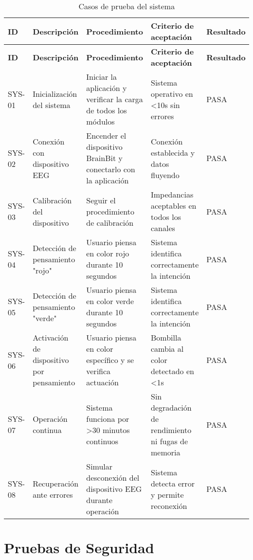 \begin{center}
\small
\begin{longtable}{|p{1cm}|p{3.5cm}|p{3.5cm}|p{3.5cm}|p{1.5cm}|}
    \caption{Casos de prueba del sistema}\label{tab:system_tests} \\
    \hline
    \textbf{ID} & \textbf{Descripción} & \textbf{Procedimiento} & \textbf{Criterio de aceptación} & \textbf{Resultado} \\
    \hline
    \endfirsthead
    \hline
    \textbf{ID} & \textbf{Descripción} & \textbf{Procedimiento} & \textbf{Criterio de aceptación} & \textbf{Resultado} \\
    \hline
    \endhead
    SYS-01 & Inicialización del sistema & Iniciar la aplicación y verificar la carga de todos los módulos & Sistema operativo en <10s sin errores & PASA \\
    \hline
    SYS-02 & Conexión con dispositivo EEG & Encender el dispositivo BrainBit y conectarlo con la aplicación & Conexión establecida y datos fluyendo & PASA \\
    \hline
    SYS-03 & Calibración del dispositivo & Seguir el procedimiento de calibración & Impedancias aceptables en todos los canales & PASA \\
    \hline
    SYS-04 & Detección de pensamiento "rojo" & Usuario piensa en color rojo durante 10 segundos & Sistema identifica correctamente la intención & PASA \\
    \hline
    SYS-05 & Detección de pensamiento "verde" & Usuario piensa en color verde durante 10 segundos & Sistema identifica correctamente la intención & PASA \\
    \hline
    SYS-06 & Activación de dispositivo por pensamiento & Usuario piensa en color específico y se verifica actuación & Bombilla cambia al color detectado en <1s & PASA \\
    \hline
    SYS-07 & Operación continua & Sistema funciona por >30 minutos continuos & Sin degradación de rendimiento ni fugas de memoria & PASA \\
    \hline
    SYS-08 & Recuperación ante errores & Simular desconexión del dispositivo EEG durante operación & Sistema detecta error y permite reconexión & PASA \\
    \hline
\end{longtable}
\end{center}


\newpage
\section{Pruebas de Seguridad}

